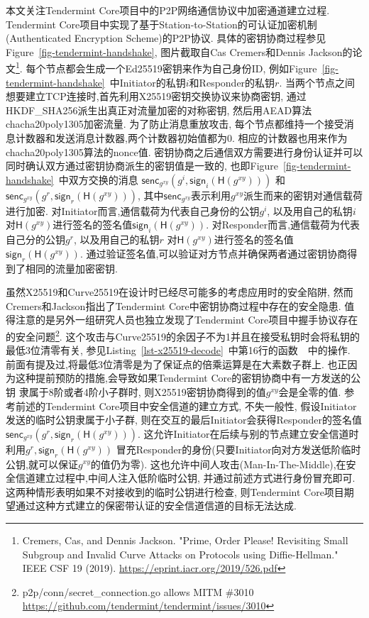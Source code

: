 本文关注Tendermint Core项目中的P2P网络通信协议中加密通道建立过程.
Tendermint Core项目中实现了基于Station-to-Station的可认证加密机制(Authenticated Encryption Scheme)的P2P协议.
具体的密钥协商过程参见Figure~\ref{fig-tendermint-handshake},
图片截取自Cas Cremers和Dennis Jackson的论文\footnote{
Cremers, Cas, and Dennis Jackson. 
"Prime, Order Please! Revisiting Small Subgroup and Invalid Curve Attacks on Protocols using Diffie-Hellman." 
IEEE CSF 19 (2019).
\url{https://eprint.iacr.org/2019/526.pdf}}.
每个节点都会生成一个Ed25519密钥来作为自己身份ID, 
例如Figure~\ref{fig-tendermint-handshake}~中Initiator的私钥$i$和Responder的私钥$r$.
当两个节点之间想要建立TCP连接时,首先利用X25519密钥交换协议来协商密钥,
通过\textsf{HKDF_SHA256}派生出真正对流量加密的对称密钥,
然后用AEAD算法\textsf{chacha20poly1305}加密流量.
为了防止消息重放攻击, 每个节点都维持一个接受消息计数器和发送消息计数器,两个计数器初始值都为0.
相应的计数器也用来作为\textsf{chacha20poly1305}算法的nonce值.
密钥协商之后通信双方需要进行身份认证并可以同时确认双方通过密钥协商派生的密钥值是一致的,
也即Figure~\ref{fig-tendermint-handshake}~中双方交换的消息
$\textsf{senc}_{g^{xy}}(g^i, \textsf{sign}_i(\textsf{H}(g^{xy})))$
和$\textsf{senc}_{g^{xy}}(g^r, \textsf{sign}_r(\textsf{H}(g^{xy})))$, 
其中$\textsf{senc}_{g^{xy}}$表示利用$g^{xy}$派生而来的密钥对通信载荷进行加密.
对Initiator而言,通信载荷为代表自己身份的公钥$g^i$, 以及用自己的私钥$i$
对$\textsf{H}(g^{xy})$进行签名的签名值$\textsf{sign}_i(\textsf{H}(g^{xy}))$.
对Responder而言,通信载荷为代表自己分的公钥$g^r$, 以及用自己的私钥$r$
对$\textsf{H}(g^{xy})$进行签名的签名值$\textsf{sign}_r(\textsf{H}(g^{xy}))$.
通过验证签名值,可以验证对方节点并确保两者通过密钥协商得到了相同的流量加密密钥.

虽然X25519和Curve25519在设计时已经尽可能多的考虑应用时的安全陷阱,
然而Cremers和Jackson指出了Tendermint Core中密钥协商过程中存在的安全隐患.
值得注意的是另外一组研究人员也独立发现了Tendermint Core项目中握手协议存在的安全问题\footnote{
p2p/conn/secret_connection.go allows MITM \#3010
\url{https://github.com/tendermint/tendermint/issues/3010}}.
这个攻击与Curve25519的余因子不为1并且在接受私钥时会将私钥的最低3位清零有关,
参见Listing~\ref{lst-x25519-decode}~中第16行的函数~~中的操作.
前面有提及过,将最低3位清零是为了保证点的倍乘运算是在大素数子群上.
也正因为这种提前预防的措施,会导致如果Tendermint Core的密钥协商中有一方发送的公钥
隶属于8阶或者4阶小子群时, 则X25519密钥协商得到的值$g^{xy}$会是全零的值.
参考前述的Tendermint Core项目中安全信道的建立方式, 不失一般性, 假设Initiator发送的临时公钥隶属于小子群,
则在交互的最后Initiator会获得Responder的签名值
$\textsf{senc}_{g^{xy}}(g^r, \textsf{sign}_r(\textsf{H}(g^{xy})))$.
这允许Initiator在后续与别的节点建立安全信道时利用$g^r, \textsf{sign}_r(\textsf{H}(g^{xy}))$
冒充Responder的身份(只要Initiator向对方发送低阶临时公钥,就可以保证$g^{xy}$的值仍为零).
这也允许中间人攻击(Man-In-The-Middle),在安全信道建立过程中,中间人注入低阶临时公钥,
并通过前述方式进行身份冒充即可. 这两种情形表明如果不对接收到的临时公钥进行检查,
则Tendermint Core项目期望通过这种方式建立的保密带认证的安全信道信道的目标无法达成.


